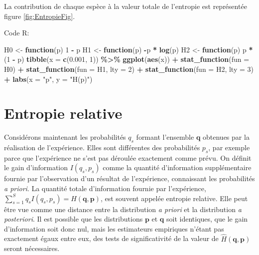 \documentclass[
  11pt,
  american,
  a4paper,
  extrafontsizes,onecolumn,openright
  ]{memoir}
\newenvironment{Shaded}{\begin{snugshade}}{\end{snugshade}}
\newcommand{\AttributeTok}[1]{\textcolor[rgb]{0.13,0.29,0.53}{#1}}
\newcommand{\ControlFlowTok}[1]{\textcolor[rgb]{0.13,0.29,0.53}{\textbf{#1}}}
\newcommand{\DecValTok}[1]{\textcolor[rgb]{0.00,0.00,0.81}{#1}}
\newcommand{\FloatTok}[1]{\textcolor[rgb]{0.00,0.00,0.81}{#1}}
\newcommand{\FunctionTok}[1]{\textcolor[rgb]{0.13,0.29,0.53}{\textbf{#1}}}
\newcommand{\NormalTok}[1]{#1}
\newcommand{\OtherTok}[1]{\textcolor[rgb]{0.56,0.35,0.01}{#1}}
\newcommand{\SpecialCharTok}[1]{\textcolor[rgb]{0.81,0.36,0.00}{\textbf{#1}}}
\newcommand{\StringTok}[1]{\textcolor[rgb]{0.31,0.60,0.02}{#1}}
\begin{document}
\normalsize

La contribution de chaque espèce à la valeur totale de l'entropie est représentée figure \ref{fig:EntropieFig}.

Code R:

\scriptsize

\begin{Shaded}
\begin{Highlighting}[]
\NormalTok{H0 }\OtherTok{\textless{}{-}} \ControlFlowTok{function}\NormalTok{(p) }\DecValTok{1} \SpecialCharTok{{-}}\NormalTok{ p}
\NormalTok{H1 }\OtherTok{\textless{}{-}} \ControlFlowTok{function}\NormalTok{(p) }\SpecialCharTok{{-}}\NormalTok{p }\SpecialCharTok{*} \FunctionTok{log}\NormalTok{(p)}
\NormalTok{H2 }\OtherTok{\textless{}{-}} \ControlFlowTok{function}\NormalTok{(p) p }\SpecialCharTok{*}\NormalTok{ (}\DecValTok{1} \SpecialCharTok{{-}}\NormalTok{ p)}
\FunctionTok{tibble}\NormalTok{(}\AttributeTok{x =} \FunctionTok{c}\NormalTok{(}\FloatTok{0.001}\NormalTok{, }\DecValTok{1}\NormalTok{)) }\SpecialCharTok{\%\textgreater{}\%} 
  \FunctionTok{ggplot}\NormalTok{(}\FunctionTok{aes}\NormalTok{(x)) }\SpecialCharTok{+} 
    \FunctionTok{stat\_function}\NormalTok{(}\AttributeTok{fun =}\NormalTok{ H0) }\SpecialCharTok{+}
    \FunctionTok{stat\_function}\NormalTok{(}\AttributeTok{fun =}\NormalTok{ H1, }\AttributeTok{lty =} \DecValTok{2}\NormalTok{) }\SpecialCharTok{+}
    \FunctionTok{stat\_function}\NormalTok{(}\AttributeTok{fun =}\NormalTok{ H2, }\AttributeTok{lty =} \DecValTok{3}\NormalTok{) }\SpecialCharTok{+}
    \FunctionTok{labs}\NormalTok{(}\AttributeTok{x =} \StringTok{"p"}\NormalTok{, }\AttributeTok{y =} \StringTok{"H(p)"}\NormalTok{)}
\end{Highlighting}
\end{Shaded}

\normalsize

\section{Entropie relative}\label{entropie-relative}

Considérons maintenant les probabilités \(q_s\) formant l'ensemble \(\mathbf{q}\) obtenues par la réalisation de l'expérience.
Elles sont différentes des probabilités \(p_s\), par exemple parce que l'expérience ne s'est pas déroulée exactement comme prévu.
On définit le gain d'information \(I(q_s, p_s)\) comme la quantité d'information supplémentaire fournie par l'observation d'un résultat de l'expérience, connaissant les probabilités \emph{a priori}.
La quantité totale d'information fournie par l'expérience, \(\sum^S_{s=1}{q_s I(q_s, p_s)} = H(\mathbf{q}, \mathbf{p})\), est souvent appelée entropie relative.
Elle peut être vue comme une distance entre la distribution \emph{a priori} et la distribution \emph{a posteriori}.
Il est possible que les distributions \(\mathbf{p}\) et \(\mathbf{q}\) soit identiques, que le gain d'information soit donc nul, mais les estimateurs empiriques n'étant pas exactement égaux entre eux, des tests de significativité de la valeur de \(\hat{H}(\mathbf{q},\mathbf{p})\) seront nécessaires.
\end{document}
